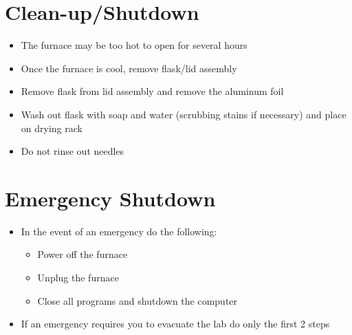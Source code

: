 \documentclass[letterpaper,11pt]{article}
\begin{document}
\section{Clean-up/Shutdown}

    \begin{itemize}
    \item The furnace may be too hot to open for several hours
    \item Once the furnace is cool, remove flask/lid assembly
    \item Remove flask from lid assembly and remove the aluminum foil
    \item Wash out flask with soap and water (scrubbing stains if necessary) and 
        place on drying rack
    \item Do not rinse out needles
    \end{itemize}

\section{Emergency Shutdown}

    \begin{itemize}
    \item In the event of an emergency do the following:
        
        \begin{itemize}
        \item Power off the furnace
        \item Unplug the furnace
        \item Close all programs and shutdown the computer
        \end{itemize}
    
    \item If an emergency requires you to evacuate the lab do only the first 
        2 steps
    \end{itemize}
    
\end{document}
